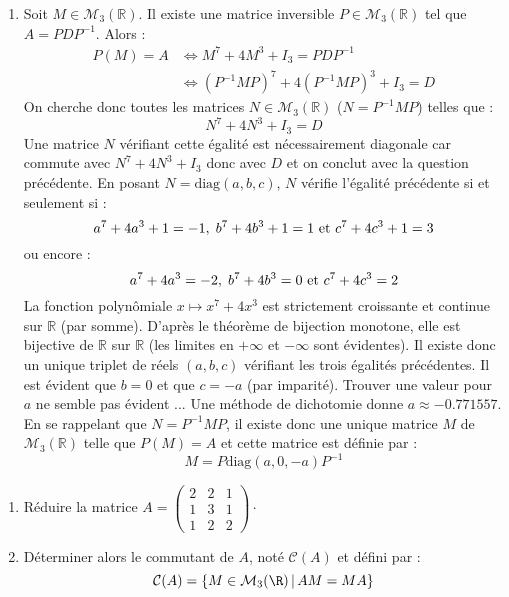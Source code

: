 \documentclass[a4paper,10pt]{report}
\begin{document}
\begin{enumerate}
\item Soit $M \in \mathcal{M}_3(\mathbb{R})$. Il existe une matrice inversible $P \in \mathcal{M}_3(\mathbb{R})$ tel que $A=PDP^{-1}$. Alors :
\begin{align*}
P(M) =A & \Longleftrightarrow M^7+4M^3 + I_3 = PDP^{-1} \\
& \Longleftrightarrow (P^{-1}MP)^7 + 4(P^{-1}MP)^3+ I_3 = D 
\end{align*}
On cherche donc toutes les matrices $N \in \mathcal{M}_3(\mathbb{R})$ ($N=P^{-1}MP$) telles que :
$$ N^7+4N^3+I_3=D$$
Une matrice $N$ vérifiant cette égalité est nécessairement diagonale car commute avec $N^7+4N^3+I_3$ donc avec $D$ et on conclut avec la question précédente. En posant $N= \textrm{diag}(a,b,c)$, $N$ vérifie l'égalité précédente si et seulement si :
$$ a^7+ 4a^3+1= -1, \; b^7+ 4b^3+1= 1 \hbox{ et } c^7+ 4c^3+1= 3 $$
ou encore :
$$ a^7+ 4a^3= -2, \; b^7+ 4b^3= 0 \hbox{ et } c^7+ 4c^3= 2 $$
La fonction polynômiale $x \mapsto x^7+4x^3$ est strictement croissante et continue sur $\mathbb{R}$ (par somme). D'après le théorème de bijection monotone, elle est bijective de $\mathbb{R}$ sur $\mathbb{R}$ (les limites en $+ \infty$ et $- \infty$ sont évidentes). Il existe donc un unique triplet de réels $(a,b,c)$ vérifiant les trois égalités précédentes. Il est évident que $b=0$ et que $c=-a$ (par imparité). Trouver une valeur pour $a$ ne semble pas évident ... Une méthode de dichotomie donne $a \approx -0.771557$. En se rappelant que $N=P^{-1}MP$, il existe donc une unique matrice $M$ de $\mathcal{M}_3(\mathbb{R})$ telle que $P(M)=A$ et cette matrice est définie par :
$$ M = P \textrm{diag}(a,0,-a) P^{-1}$$
\end{enumerate}

\begin{Exercice}{}
\begin{enumerate}
\item R\'eduire la matrice $A= \left(\begin{array}{rrr}  2 & 2 & 1\\
1 & 3 & 1\\
1 & 2 & 2 \end{array}\right) \cdot $\\
\item Déterminer alors le commutant de $A$, noté $\mathcal{C}(A)$ et défini par : 
$${\cal C}(A)=\{M\in{\cal M}_3(\R) \, \vert \, AM=MA\}$$
\end{enumerate}
\end{Exercice} 

\corr 
\end{document}

